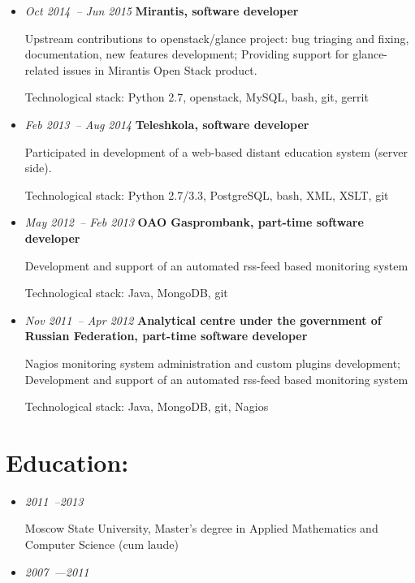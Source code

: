 \documentclass{res}
\begin{document}
\begin{resume}
\begin{itemize}
            \item \textit{Oct 2014~-- Jun 2015}
                \textbf{Mirantis, software developer}

                Upstream contributions to openstack/glance project: bug triaging and fixing, documentation, new features development; Providing support for glance-related issues in Mirantis Open Stack product.

                Technological stack: Python 2.7, openstack, MySQL, bash, git, gerrit
            \item \textit{Feb 2013~-- Aug 2014}
                \textbf{Teleshkola, software developer}

                Participated in development of a web-based distant education system (server side).

                Technological stack: Python 2.7/3.3, PostgreSQL, bash, XML, XSLT, git
            \item \textit{May 2012~-- Feb 2013}
                \textbf{OAO Gasprombank, part-time software developer}

                Development and support of an automated rss-feed based monitoring system

                Technological stack: Java, MongoDB, git

            \item \textit{Nov 2011~-- Apr 2012}
                \textbf{Analytical centre under the government of Russian Federation, part-time software developer}

                Nagios monitoring system administration and custom plugins development; Development and support of an automated rss-feed based monitoring system

                Technological stack: Java, MongoDB, git, Nagios

        \end{itemize}

        \section{Education:}
        \begin{itemize}
          \item \textit{2011~--2013}

              Moscow State University, Master's degree in Applied Mathematics and Computer Science (cum laude)

            \item \textit{2007~---2011}


\end{itemize}
\end{resume}
\end{document}
